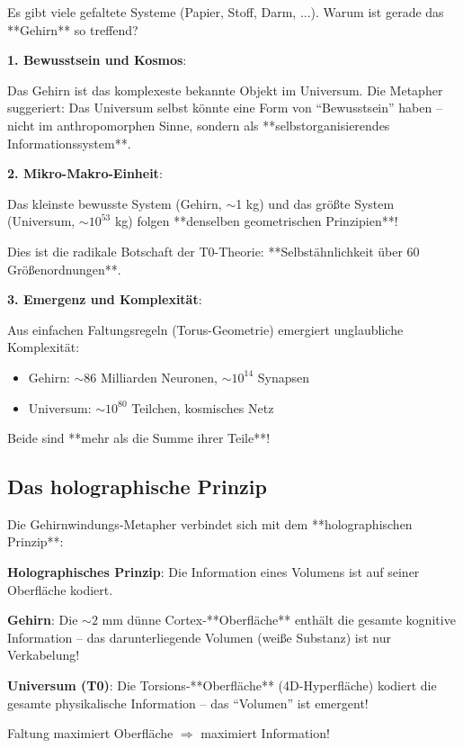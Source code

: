 	Es gibt viele gefaltete Systeme (Papier, Stoff, Darm, ...). Warum ist gerade das **Gehirn** so treffend?
	
	\begin{philosophical}
		\textbf{1. Bewusstsein und Kosmos}:
		
		Das Gehirn ist das komplexeste bekannte Objekt im Universum. Die Metapher suggeriert: Das Universum selbst könnte eine Form von \enquote{Bewusstsein} haben -- nicht im anthropomorphen Sinne, sondern als **selbstorganisierendes Informationssystem**.
		
		\vspace{0.3cm}
		
		\textbf{2. Mikro-Makro-Einheit}:
		
		Das kleinste bewusste System (Gehirn, $\sim$1 kg) und das größte System (Universum, $\sim 10^{53}$ kg) folgen **denselben geometrischen Prinzipien**!
		
		Dies ist die radikale Botschaft der T0-Theorie: **Selbstähnlichkeit über 60 Größenordnungen**.
		
		\vspace{0.3cm}
		
		\textbf{3. Emergenz und Komplexität}:
		
		Aus einfachen Faltungsregeln (Torus-Geometrie) emergiert unglaubliche Komplexität:
		\begin{itemize}
			\item Gehirn: $\sim 86$ Milliarden Neuronen, $\sim 10^{14}$ Synapsen
			\item Universum: $\sim 10^{80}$ Teilchen, kosmisches Netz
		\end{itemize}
		
		Beide sind **mehr als die Summe ihrer Teile**!
	\end{philosophical}
	
	\subsection{Das holographische Prinzip}
	
	Die Gehirnwindungs-Metapher verbindet sich mit dem **holographischen Prinzip**:
	
	\begin{keyresult}[Holographie]
		\textbf{Holographisches Prinzip}: Die Information eines Volumens ist auf seiner Oberfläche kodiert.
		
		\vspace{0.3cm}
		
		\textbf{Gehirn}: Die $\sim 2$ mm dünne Cortex-**Oberfläche** enthält die gesamte kognitive Information -- das darunterliegende Volumen (weiße Substanz) ist nur Verkabelung!
		
		\vspace{0.3cm}
		
		\textbf{Universum (T0)}: Die Torsions-**Oberfläche** (4D-Hyperfläche) kodiert die gesamte physikalische Information -- das \enquote{Volumen} ist emergent!
		
		\vspace{0.3cm}
		
		Faltung maximiert Oberfläche $\Rightarrow$ maximiert Information!
	\end{keyresult}
	
